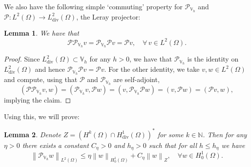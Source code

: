\documentclass[10pt,letterpaper]{amsart}
\newcommand{\N}{\mathbb{N}}
\newcommand\norm[1]{\left\lVert#1\right\rVert}
\newcommand{\Div}{\operatorname{div}}
\newcommand{\dom}{\Omega}
\newcommand{\Vh}{\mathbb{V}_h}
\newcommand{\PVh}{\mathcal{P}_{\Vh}}
\newcommand{\Pl}{\mathcal{P}} %
\newtheorem{lemma}{Lemma}[section]
\theoremstyle{definition}{\newtheorem{definition}[lemma]{Definition}}
\numberwithin{equation}{section}
\begin{document}
We also have the following simple `commuting' property for $\PVh$ and $\Pl: L^2(\dom)\to L^2_{\Div}(\dom)$, the Leray projector:
\begin{lemma}
	\label{lem:commuting}
	We have that
	\begin{equation}\label{eq:commuting}
		\Pl \PVh v = \PVh \Pl v = \Pl v,\quad \forall \, v\in L^2(\dom).
	\end{equation}
\end{lemma}
\begin{proof}
	Since $L^2_{\Div}(\dom)\subset \Vh$ for any $h>0$, we have that $\PVh$ is the identity on $L^2_{\Div}(\dom)$ and hence $\PVh \Pl v = \Pl v$. For the other identity, we take $v,w\in L^2(\dom)$ and compute, using that $\Pl$ and $\PVh$ are self-adjoint,
	\begin{equation*}
		(\Pl\PVh v,w) = (\PVh v, \Pl w) = (v,\PVh\Pl w) = (v,\Pl w) = (\Pl v,w),
	\end{equation*}
	implying the claim.
\end{proof}
Using this, we will prove:
\begin{lemma}\label{lem:lionslike}
	Denote $Z = (H^k(\dom)\cap H^1_{\Div}(\dom))^*$ for some $k\in \N$. Then for any $\eta>0$ there exists a constant $C_\eta>0$ and $h_\eta>0 $ such that for all $h\leq h_{\eta}$ we have
	\begin{equation}\label{eq:lionslike}
		\norm{\PVh w}_{L^2(\dom)}\leq \eta \norm{w}_{H^1_0(\dom)} + C_\eta \norm{w}_Z,\quad \forall w\in H^1_0(\dom).
	\end{equation}
\end{lemma}	
\end{document}
